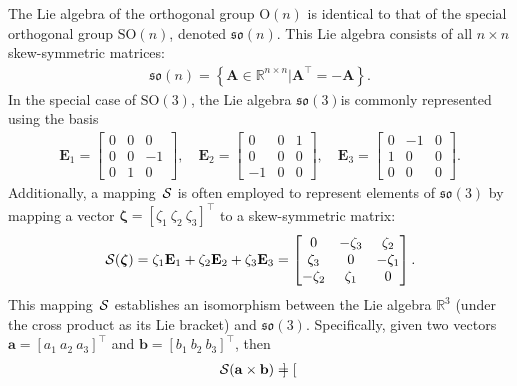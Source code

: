 \begin{example}
    The Lie algebra of the orthogonal group $\text{O}(n)$  is identical to that of the special orthogonal group $\text{SO}(n)$, denoted $\mathfrak{so}(n)$. This Lie algebra consists of all $n\times n$ skew-symmetric matrices:
    \begin{align*}
        \mathfrak{so}(n) = \left\{\mathbf{A}\in\mathbb{R}^{n\times n} | \mathbf{A}^\top = -\mathbf{A}\right\}.
    \end{align*}
    In the special case of $\text{SO}(3)$, the Lie algebra $\mathfrak{so}(3)$is commonly represented using the basis
    \begin{align*}
        \mathbf{E}_1 = \begin{bmatrix} 0 & 0 & 0 \\ 0 & 0 & -1 \\ 0 & 1 & 0 \end{bmatrix}, \quad \mathbf{E}_2 = \begin{bmatrix} 0 & 0 & 1 \\ 0 & 0 & 0 \\ -1 & 0 & 0 \end{bmatrix}, \quad \mathbf{E}_3 = \begin{bmatrix} 0 & -1 & 0 \\ 1 & 0 & 0 \\ 0 & 0 & 0 \end{bmatrix}.
    \end{align*}
    Additionally, a mapping $\SL$ is often employed to represent elements of $\mathfrak{so}(3)$ by mapping a vector $\boldsymbol{\zeta} = [\zeta_1\ \zeta_2\ \zeta_3]^\top$ to a skew-symmetric matrix:
    \begin{align*}
        \SL[\boldsymbol{\zeta}] = \zeta_1 \mathbf{E}_1 + \zeta_2 \mathbf{E}_2 + \zeta_3 \mathbf{E}_3
        = \begin{bmatrix} 0 & -\zeta_3 & \zeta_2 \\ \zeta_3 & 0 & -\zeta_1 \\ -\zeta_2 & \zeta_1 & 0 \end{bmatrix}.
    \end{align*}
    This mapping $\SL$ establishes an isomorphism between the Lie algebra $\mathbb{R}^3$ (under the cross product as its Lie bracket) and $\mathfrak{so}(3)$. Specifically, given two vectors $\mathbf{a} = [a_1\ a_2\ a_3]^\top$ and $\mathbf{b} = [b_1\ b_2\ b_3]^\top$, then 
    \begin{align*}
        \SL[\mathbf{a}\times \mathbf{b}] &= \begin{bmatrix}

\end{bmatrix}
\end{align*}
\end{example}
